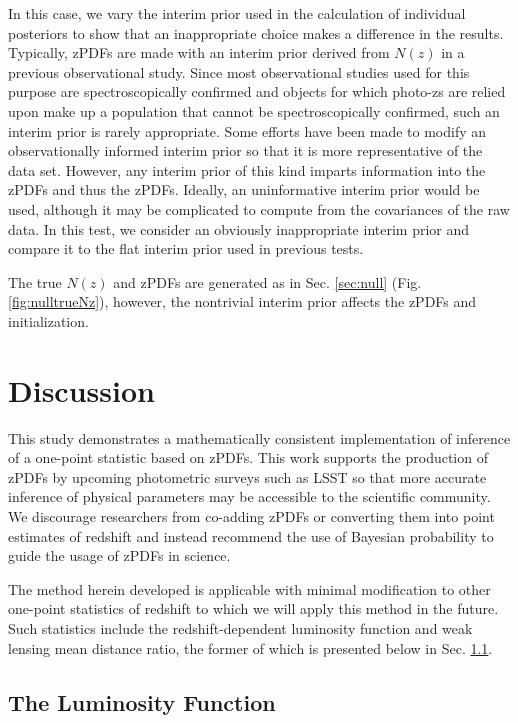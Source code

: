 \documentclass[preprint]{aastex}
\begin{document}
In this case, we vary the interim prior used in the calculation of individual posteriors to show that an inappropriate choice makes a difference in the results.  Typically, zPDFs are made with an interim prior derived from $N(z)$ in a previous observational study.  Since most observational studies used for this purpose are spectroscopically confirmed and objects for which photo-zs are relied upon make up a population that cannot be spectroscopically confirmed, such an interim prior is rarely appropriate.  Some efforts have been made to modify an observationally informed interim prior so that it is more representative of the data set.  \citep{she11}  However, any interim prior of this kind imparts information into the zPDFs and thus the zPDFs.  Ideally, an uninformative interim prior would be used, although it may be complicated to compute from the covariances of the raw data.  In this test, we consider an obviously inappropriate interim prior and compare it to the flat interim prior used in previous tests.

The true $N(z)$ and zPDFs are generated as in Sec. \ref{sec:null} (Fig. \ref{fig:nulltrueNz}), however, the nontrivial interim prior affects the zPDFs and initialization.  

\clearpage
\section{Discussion}
\label{sec:disc}

This study demonstrates a mathematically consistent implementation of inference of a one-point statistic based on zPDFs.  This work supports the production of zPDFs by upcoming photometric surveys such as LSST so that more accurate inference of physical parameters may be accessible to the scientific community.  We discourage researchers from co-adding zPDFs or converting them into point estimates of redshift and instead recommend the use of Bayesian probability to guide the usage of zPDFs in science.

The method herein developed is applicable with minimal modification to other one-point statistics of redshift to which we will apply this method in the future.  Such statistics include the redshift-dependent luminosity function and weak lensing mean distance ratio, the former of which is presented below in Sec. \ref{sec:lf}.

\clearpage
\subsection{The Luminosity Function}
\label{sec:lf}
\end{document}
